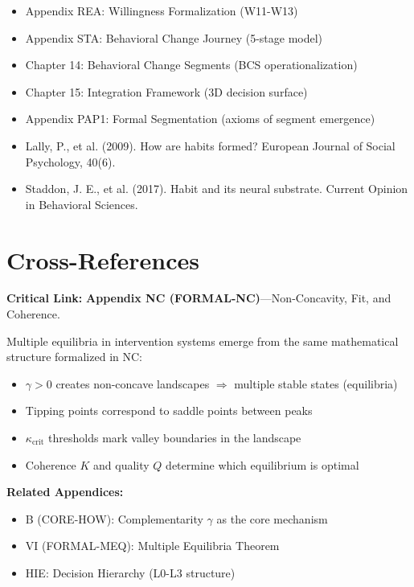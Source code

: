 \documentclass[11pt, a4paper]{article}
\begin{document}
\begin{itemize}
    \item Appendix REA: Willingness Formalization (W11-W13)
    \item Appendix STA: Behavioral Change Journey (5-stage model)
    \item Chapter 14: Behavioral Change Segments (BCS operationalization)
    \item Chapter 15: Integration Framework (3D decision surface)
    \item Appendix PAP1: Formal Segmentation (axioms of segment emergence)
    \item Lally, P., et al. (2009). How are habits formed? European Journal of Social Psychology, 40(6).
    \item Staddon, J. E., et al. (2017). Habit and its neural substrate. Current Opinion in Behavioral Sciences.
\end{itemize}


\section{Cross-References}
\label{sec:equ-crossref}

\begin{tcolorbox}[colback=gray!5!white, colframe=gray!50!black]
\textbf{Critical Link:} \textbf{Appendix NC (FORMAL-NC)}---Non-Concavity, Fit, and Coherence.

Multiple equilibria in intervention systems emerge from the same mathematical structure formalized in NC:
\begin{itemize}[nosep]
\item $\gamma > 0$ creates non-concave landscapes $\Rightarrow$ multiple stable states (equilibria)
\item Tipping points correspond to saddle points between peaks
\item $\kappa_{\text{crit}}$ thresholds mark valley boundaries in the landscape
\item Coherence $K$ and quality $Q$ determine which equilibrium is optimal
\end{itemize}

\textbf{Related Appendices:}
\begin{itemize}[nosep]
\item B (CORE-HOW): Complementarity $\gamma$ as the core mechanism
\item VI (FORMAL-MEQ): Multiple Equilibria Theorem
\item HIE: Decision Hierarchy (L0-L3 structure)
\end{itemize}
\end{tcolorbox}
\end{document}
